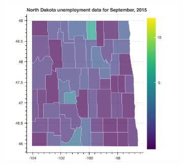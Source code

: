 \documentclass[11pt,letterpaper]{article}
\begin{document}
\begin{figure}[h!]
~
\begin{subfigure}{0.3\textwidth}
\includegraphics[width=1.2\linewidth]{nd_unemp_2015}
\end{subfigure}


\end{figure}
\end{document}
